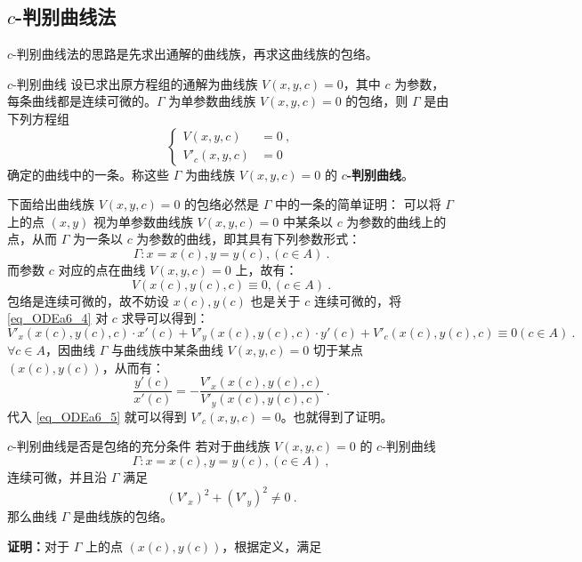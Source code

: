 \subsection{$c$-判别曲线法}\label{sub_ODEa6_2}
$c$-判别曲线法的思路是先求出通解的曲线族，再求这曲线族的包络。
\begin{definition}{$c$-判别曲线}
设已求出原方程组的通解为曲线族 $V(x,y,c)=0$，其中 $c$ 为参数，每条曲线都是连续可微的。$\Gamma$ 为单参数曲线族 $V(x,y,c)=0$ 的包络，则 $\Gamma$ 是由下列方程组
\begin{equation}\label{eq_ODEa6_3}
\left \{
\begin{aligned}
V(x,y,c) &= 0~,\\
V'_c(x,y,c) &= 0~
\end{aligned}
\right .
\end{equation}
确定的曲线中的一条。称这些 $\Gamma$ 为曲线族 $V(x,y,c)=0$ 的 \textbf{$c$-判别曲线}。
\end{definition}
下面给出曲线族 $V(x,y,c)=0$ 的包络必然是 $\Gamma$ 中的一条的简单证明：
可以将 $\Gamma$ 上的点 $(x, y)$ 视为单参数曲线族 $V(x,y,c)=0$ 中某条以 $c$ 为参数的曲线上的点，从而 $\Gamma$ 为一条以 $c$ 为参数的曲线，即其具有下列参数形式：
\begin{equation}
\Gamma: x=x(c), y=y(c), (c \in A) ~.
\end{equation}
而参数 $c$ 对应的点在曲线 $V(x,y,c)=0$ 上，故有：
\begin{equation}\label{eq_ODEa6_4}
V(x(c), y(c), c) \equiv 0, (c \in A) ~.
\end{equation}
包络是连续可微的，故不妨设 $x(c), y(c)$ 也是关于 $c$ 连续可微的，将 \autoref{eq_ODEa6_4} 对 $c$ 求导可以得到：
\begin{equation}\label{eq_ODEa6_5}
V'_x(x(c), y(c), c) \cdot x'(c) + V'_y(x(c), y(c), c) \cdot y'(c) + V'_c(x(c), y(c), c) \equiv 0 (c \in A)~.
\end{equation}
$\forall c \in A$，因曲线 $\Gamma$ 与曲线族中某条曲线 $V(x,y,c)=0$ 切于某点 $(x(c), y(c))$，从而有：
\begin{equation}\label{eq_ODEa6_6}
\frac{y'(c)}{x'(c)} = -\frac{V'_x(x(c), y(c), c)}{V'_y(x(c), y(c), c)} ~.
\end{equation}
代入 \autoref{eq_ODEa6_5} 就可以得到 $V'_c(x, y, c)=0$。也就得到了证明。

\begin{theorem}{$c$-判别曲线是否是包络的充分条件}
若对于曲线族 $V(x,y,c)=0$ 的 $c$-判别曲线 
$$\Gamma: x=x(c), y=y(c), (c \in A) ~,$$
连续可微，并且沿 $\Gamma$ 满足
$$(V'_x)^2 + (V'_y)^2 \neq 0 ~.$$
那么曲线 $\Gamma$ 是曲线族的包络。
\end{theorem}
\textbf{证明：}对于 $\Gamma$ 上的点 $(x(c), y(c))$，根据定义，满足